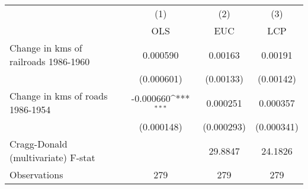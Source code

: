 {
\def\sym#1{\ifmmode^{#1}\else\(^{#1}\)\fi}
\begin{tabular}{l*{3}{c}}
\hline\hline
                &\multicolumn{1}{c}{(1)}&\multicolumn{1}{c}{(2)}&\multicolumn{1}{c}{(3)}\\
                &\multicolumn{1}{c}{OLS}&\multicolumn{1}{c}{EUC}&\multicolumn{1}{c}{LCP}\\
\hline
Change in kms of railroads 1986-1960& 0.000590         &  0.00163         &  0.00191         \\
                &(0.000601)         &(0.00133)         &(0.00142)         \\
[1em]
Change in kms of roads 1986-1954&-0.000660\sym{***}& 0.000251         & 0.000357         \\
                &(0.000148)         &(0.000293)         &(0.000341)         \\
\hline
Cragg-Donald (multivariate) F-stat&                  &  29.8847         &  24.1826         \\
Observations    &      279         &      279         &      279         \\
\hline\hline
\end{tabular}
}
